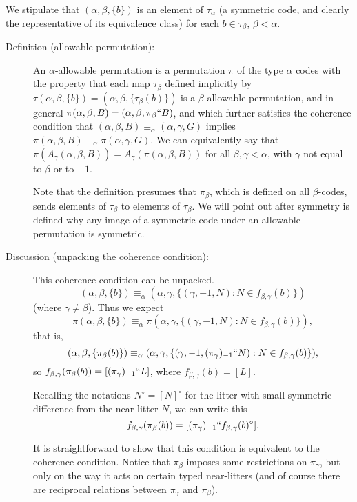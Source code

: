 \documentclass[112pt]{article}
\begin{document}
We stipulate that $(\alpha,\beta,\{b\})$ is an element of $\tau_\alpha$ (a symmetric code, and clearly the representative of its equivalence class) for each $b \in \tau_\beta$, $\beta<\alpha$.

\begin{description}
\item[Definition (allowable permutation):]   An $\alpha$-allowable permutation is a permutation $\pi$ of the type $\alpha$ codes with the property that each map $\tau_\beta$
defined implicitly by $\tau(\alpha,\beta,\{b\}) = (\alpha,\beta,\{\tau_\beta(b)\})$ is a $\beta$-allowable permutation, and in general $\pi(\alpha,\beta,B) = (\alpha,\beta,\pi_\beta``B)$,  and which further satisfies the coherence condition that $(\alpha,\beta,B) \equiv_\alpha (\alpha,\gamma,G)$ implies
$\pi(\alpha,\beta,B) \equiv_\alpha \pi(\alpha,\gamma,G)$.  We can equivalently say that $\pi(A_\gamma(\alpha,\beta,B)) = A_\gamma(\pi(\alpha,\beta,B))$ for all $\beta,\gamma <\alpha$, with $\gamma$ not equal to $\beta$ or to $-1$.

Note that the definition presumes that $\pi_\beta$, which is defined on all $\beta$-codes, sends elements of $\tau_\beta$ to elements of $\tau_\beta$.  We will point out after symmetry is defined why any image of a symmetric code under an allowable permutation is symmetric.

\item[Discussion (unpacking the coherence condition):]  This coherence condition can be unpacked.  $$(\alpha,\beta,\{b\}) \equiv_{\alpha} (\alpha,\gamma,\{(\gamma,-1,N):N \in f_{\beta,\gamma}(b)\})$$ (where $\gamma\neq \beta$).  Thus we expect $$\pi(\alpha,\beta,\{b\}) \equiv_{\alpha} \pi(\alpha,\gamma,\{(\gamma,-1,N):N \in f_{\beta,\gamma}(b)\}),$$ that is, $$(\alpha,\beta,\{\pi_{\beta}(b)\}) \equiv_{\alpha} (\alpha,\gamma,\{(\gamma,-1,(\pi_{\gamma})_{-1}``N):N \in f_{\beta,\gamma}(b)\}),$$ so $f_{\beta,\gamma}(\pi_\beta(b)) = [(\pi_\gamma)_{-1}``L]$, where $f_{\beta,\gamma}(b)=[L]$.  

Recalling the notations $N^\circ=[N]^\circ$ for the litter with small symmetric difference from the near-litter $N$, we can write this $$f_{\beta,\gamma}(\pi_\beta(b)) = [(\pi_\gamma)_{-1}``f_{\beta,\gamma}(b)^\circ].$$

It is straightforward to show that this condition is equivalent to the coherence condition.  Notice that $\pi_\beta$ imposes some restrictions on $\pi_\gamma$, but only on the way it acts on certain typed near-litters (and of course there are reciprocal relations between $\pi_{\gamma}$ and $\pi_\beta$).


\end{description}
\end{document}
